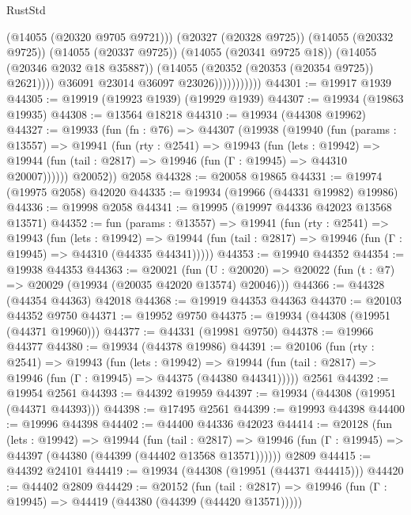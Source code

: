 \begin{lexlean}{RustStd}
\begin{coremodule}
                                (@14055 (@20320 @9705 @9721)))
                              (@20327 (@20328 @9725))
                              (@14055 (@20332 @9725))
                              (@14055 (@20337 @9725))
                              (@14055 (@20341 @9725 @18))
                              (@14055 (@20346 @2032 @18 @35887))
                              (@14055 (@20352 (@20353 (@20354 @9725)) @2621))))
                          @36091
                          @23014
                          @36097
                          @23026)))))))))))
@44301 := @19917 @1939
@44305 := @19919 (@19923 @1939) (@19929 @1939)
@44307 := @19934 (@19863 @19935)
@44308 := @13564 @18218
@44310 := @19934 (@44308 @19962)
@44327 := @19933
    (fun (fn : @76) =>
    @44307
      (@19938
        (@19940
          (fun (params : @13557) =>
          @19941
            (fun (rty : @2541) =>
            @19943
              (fun (lets : @19942) =>
              @19944 (fun (tail : @2817) => @19946 (fun (Γ : @19945) => @44310 @20007))))))
        @20052))
    @2058
@44328 := @20058 @19865
@44331 := @19974 (@19975 @2058) @42020
@44335 := @19934 (@19966 (@44331 @19982) @19986)
@44336 := @19998 @2058
@44341 := @19995 (@19997 @44336 @42023 @13568 @13571)
@44352 := fun (params : @13557) =>
  @19941
    (fun (rty : @2541) =>
    @19943
      (fun (lets : @19942) =>
      @19944 (fun (tail : @2817) => @19946 (fun (Γ : @19945) => @44310 (@44335 @44341)))))
@44353 := @19940 @44352
@44354 := @19938 @44353
@44363 := @20021
    (fun (U : @20020) => @20022 (fun (t : @7) => @20029 (@19934 (@20035 @42020 @13574) @20046)))
@44366 := @44328 (@44354 @44363) @42018
@44368 := @19919 @44353 @44363
@44370 := @20103 @44352 @9750
@44371 := @19952 @9750
@44375 := @19934 (@44308 (@19951 (@44371 @19960)))
@44377 := @44331 (@19981 @9750)
@44378 := @19966 @44377
@44380 := @19934 (@44378 @19986)
@44391 := @20106
    (fun (rty : @2541) =>
    @19943
      (fun (lets : @19942) =>
      @19944 (fun (tail : @2817) => @19946 (fun (Γ : @19945) => @44375 (@44380 @44341)))))
    @2561
@44392 := @19954 @2561
@44393 := @44392 @19959
@44397 := @19934 (@44308 (@19951 (@44371 @44393)))
@44398 := @17495 @2561
@44399 := @19993 @44398
@44400 := @19996 @44398
@44402 := @44400 @44336 @42023
@44414 := @20128
    (fun (lets : @19942) =>
    @19944
      (fun (tail : @2817) =>
      @19946 (fun (Γ : @19945) => @44397 (@44380 (@44399 (@44402 @13568 @13571))))))
    @2809
@44415 := @44392 @24101
@44419 := @19934 (@44308 (@19951 (@44371 @44415)))
@44420 := @44402 @2809
@44429 := @20152
    (fun (tail : @2817) => @19946 (fun (Γ : @19945) => @44419 (@44380 (@44399 (@44420 @13571)))))

\end{coremodule}
\end{lexlean}
